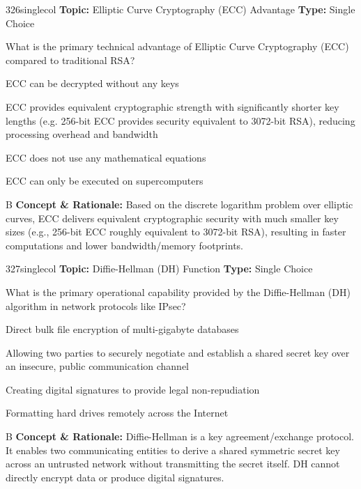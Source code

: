 \begin{qcard}{326}{singlecol}
\textcolor{darkslate!75}{\small\textbf{Topic:} Elliptic Curve Cryptography (ECC) Advantage \hfill \textbf{Type:} Single Choice}\vspace{0.4em}\par
What is the primary technical advantage of Elliptic Curve Cryptography (ECC) compared to traditional RSA?
\begin{qoptions}
\item ECC can be decrypted without any keys
\item ECC provides equivalent cryptographic strength with significantly shorter key lengths (e.g. 256-bit ECC provides security equivalent to 3072-bit RSA), reducing processing overhead and bandwidth
\item ECC does not use any mathematical equations
\item ECC can only be executed on supercomputers
\end{qoptions}
\end{qcard}
\nopagebreak
\begin{explainbox}{B}
\textbf{Concept \& Rationale:} Based on the discrete logarithm problem over elliptic curves, ECC delivers equivalent cryptographic security with much smaller key sizes (e.g., 256-bit ECC roughly equivalent to 3072-bit RSA), resulting in faster computations and lower bandwidth/memory footprints.
\end{explainbox}

\begin{qcard}{327}{singlecol}
\textcolor{darkslate!75}{\small\textbf{Topic:} Diffie-Hellman (DH) Function \hfill \textbf{Type:} Single Choice}\vspace{0.4em}\par
What is the primary operational capability provided by the Diffie-Hellman (DH) algorithm in network protocols like IPsec?
\begin{qoptions}
\item Direct bulk file encryption of multi-gigabyte databases
\item Allowing two parties to securely negotiate and establish a shared secret key over an insecure, public communication channel
\item Creating digital signatures to provide legal non-repudiation
\item Formatting hard drives remotely across the Internet
\end{qoptions}
\end{qcard}
\nopagebreak
\begin{explainbox}{B}
\textbf{Concept \& Rationale:} Diffie-Hellman is a key agreement/exchange protocol. It enables two communicating entities to derive a shared symmetric secret key across an untrusted network without transmitting the secret itself. DH cannot directly encrypt data or produce digital signatures.
\end{explainbox}

